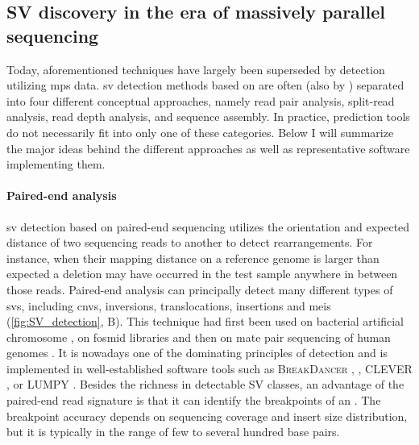 \subsection{SV discovery in the era of massively parallel sequencing}
\label{sec:sv_detection_ngs}

Today, aforementioned techniques have largely been superseded by \sv detection
utilizing \acl{mps} data.
\Ac{sv} detection methods based on \mps are often (also by \cite{Alkan2011})
separated into four different conceptual approaches, namely read pair analysis,
split-read analysis, read depth analysis, and sequence assembly. In practice,
\sv prediction tools do not necessarily fit into only one of these categories.
Below I will summarize the major ideas behind the different approaches as well
as representative software implementing them.

\paragraph{Paired-end analysis}
\Ac{sv} detection based on paired-end sequencing utilizes the orientation and
expected distance of two sequencing reads to another to detect rearrangements.
For instance, when their mapping distance on a reference genome is larger than
expected a deletion may have occurred in the test sample anywhere in between
those reads. Paired-end analysis can principally detect many different types of
\acp{sv}, including \acp{cnv}, inversions, translocations, insertions and
\acp{mei} (\cref{fig:SV_detection}, B). This technique had first been used on
bacterial artificial chromosome
\citep{Volik2003}, on fosmid libraries \citep{Tuzun2005} and then on mate pair
sequencing of human genomes \citep{Korbel2007}. It is nowadays one of the
dominating principles of \sv detection and is implemented in well-established
software tools such as \textsc{BreakDancer} \citep{Chen2009}, \delly,
\textsc{CLEVER} \citep{Marschall2012}, or \textsc{LUMPY} \citep{Layer2014}.
Besides the richness in detectable SV classes, an advantage of the paired-end
read signature is that it can identify the breakpoints of an \sv. The breakpoint
accuracy depends on sequencing coverage and insert size distribution, but
it is typically in the range of few to several hundred base pairs.


